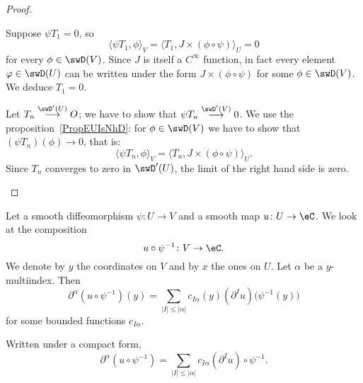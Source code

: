 \begin{proof}
\begin{subproof}

		Suppose \( \psi T_1=0\), so
		\begin{equation}
			\langle \psi T_1, \phi\rangle_V =\langle T_1, J\times (\phi\circ\psi)\rangle_U=0
		\end{equation}
		for every \( \phi\in \swD(V)\). Since \( J\) is itself a \(  C^{\infty}\) function, in fact every element \( \varphi\in \swD(U)\) can be written under the form \( J\times (\phi\circ\psi)\) for some \( \phi\in\swD(V)\). We deduce \( T_1=0\).


		Let \( T_n\stackrel{\swD'(U)}{\longrightarrow}O\); we have to show that \( \psi T_n\stackrel{\swD'(V)}{\longrightarrow}0\). We use the proposition~\ref{PropEUIsNhD}: for \( \phi\in\swD(V)\) we have to show that \( (\psi T_n)(\phi)\to 0\), that is:
		\begin{equation}
			\langle \psi T_n, \phi\rangle_V=\langle T_n, J\times (\phi\circ\psi)\rangle_U.
		\end{equation}
		Since \( T_n\) converges to zero in \( \swD'(U)\), the limit of the right hand side is zero.
	\end{subproof}
\end{proof}

\begin{lemma}       \label{LEMooJHFUooWdAlar}
	Let a smooth diffeomorphism \( \psi\colon U\to V\) and a smooth map \( u\colon U\to \eC\). We look at the composition
	\begin{equation}
		u\circ\psi^{-1}\colon V\to \eC.
	\end{equation}
	We denote by \( y\) the coordinates on \( V\) and by \( x\) the ones on \( U\). Let \( \alpha\) be a \( y\)-multiindex. Then
	\begin{equation}
		\partial^{\alpha}(u\circ\psi^{-1})(y)=\sum_{| I |\leq | \alpha |}c_{I \alpha}(y)(\partial^{I}u)\big( \psi^{-1}(y) \big)
	\end{equation}
	for some bounded functions \( c_{I \alpha}\).

	Written under a compact form,
	\begin{equation}
		\partial^{\alpha}(u\circ\psi^{-1})=\sum_{| I |\leq | \alpha |}c_{I \alpha}(\partial^Iu)\circ\psi^{-1}.
	\end{equation}
\end{lemma}

